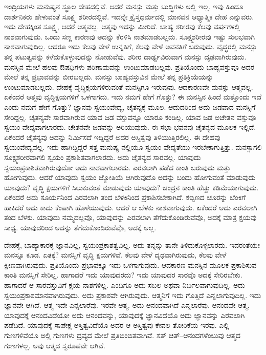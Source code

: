 \vskip 0.2cm

ಇಂದ್ರಿಯಗಳು ಮನುಷ್ಯನ ಸ್ಥೂಲ ದೇಹದಲ್ಲಿವೆ. ಆದರೆ ಮನಸ್ಸು ಮತ್ತು ಬುದ್ಧಿಗಳು ಅಲ್ಲಿ ಇಲ್ಲ. ಇವು ಹಿಂದೂ ದಾರ್ಶನಿಕರು ಹೇಳುವಂತೆ ಸೂಕ್ಷ್ಮ ಶರೀರದಲ್ಲಿವೆ. ಇದನ್ನೇ ಕ್ರೈಸ್ತಧರ್ಮದಲ್ಲಿ ಮಾನವನ ಆಧ್ಯಾತ್ಮಿಕ ದೇಹ ಎನ್ನುವರು. ಇದು ದೇಹಕ್ಕಿಂತ ಸೂಕ್ಷ್ಮ, ಆದರೆ ಆತ್ಮವಲ್ಲ. ಆತ್ಮವು ಇದನ್ನು ಮೀರಿದೆ. ಬಾಹ್ಯ ಶರೀರವು ಕೆಲವು ವರ್ಷಗಳಲ್ಲಿ ನಾಶವಾಗುವುದು. ಒಂದು ಸಣ್ಣ ಕಾರಣವು ಅದನ್ನು ಕೆರಳಿಸಿ ನಾಶಮಾಡಬಲ್ಲದು. ಸೂಕ್ಷ್ಮಶರೀರವು ಇಷ್ಟು ಸುಲಭವಾಗಿ ನಾಶವಾಗುವುದಿಲ್ಲ. ಆದರೂ ಇದು ಕೆಲವು ವೇಳೆ ಉನ್ನತಿಗೆ, ಕೆಲವು ವೇಳೆ ಅವನತಿಗೆ ಬರುವುದು. ವೃದ್ಧರಲ್ಲಿ ಮನಸ್ಸು ತನ್ನ ಪಟುತ್ವವನ್ನು ಕಳೆದುಕೊಳ್ಳುವುದನ್ನು ನೋಡುವೆವು. ಶರೀರ ದಾರ್ಢ್ಯವಿರುವಾಗ ಮನಸ್ಸು ದೃಢವಾಗಿರುವುದು. ಮನಸ್ಸಿನ ಮೇಲೆ ಹಲವು ಔಷಧಿಗಳು ಪರಿಣಾಮವನ್ನು ಉಂಟುಮಾಡಬಲ್ಲವು. ಪ್ರತಿಯೊಂದು ಬಾಹ್ಯವಸ್ತುವೂ ಅದರ ಮೇಲೆ ತನ್ನ ಪ್ರಭಾವವನ್ನು ಬೀರಬಲ್ಲದು. ಮನಸ್ಸು ಬಾಹ್ಯವಸ್ತುವಿನ ಮೇಲೆ ತನ್ನ ಪ್ರತಿಕ್ರಿಯೆಯನ್ನು ಉಂಟುಮಾಡಬಲ್ಲದು. ದೇಹಕ್ಕೆ ವೃದ್ಧಿಕ್ಷಯಗಳಿರುವಂತೆ ಮನಸ್ಸಿಗೂ ಇರುವುವು. ಆದಕಾರಣವೇ ಮನಸ್ಸು ಆತ್ಮವಲ್ಲ. ಏಕೆಂದರೆ ಆತ್ಮವು ವೃದ್ಧಿಕ್ಷಯಗಳಿಗೆ ಒಳಗಾಗದು. ಇದು ನಮಗೆ ಹೇಗೆ ಗೊತ್ತು? ಈ ಮನಸ್ಸಿನ ಹಿಂದೆ ಮತ್ತೊಂದು ಇದೆ ಎಂದು ನಮಗೆ ಹೇಗೆ ಗೊತ್ತು? ಜ್ಞಾನವು ಸ್ವಯಂವೇದ್ಯ, ಚೈತನ್ಯಕ್ಕೆ ಮೂಲ. ಆದುದರಿಂದ ಅದು ಜಡವಾದ ಮನಸ್ಸಿಗೆ ಸೇರಿದ್ದಲ್ಲ. ಚೈತನ್ಯವೇ ಸಾರವಾಗಿರುವ ಯಾವ ಜಡ ವಸ್ತುವನ್ನೂ ಯಾರೂ ಕಂಡಿಲ್ಲ. ಯಾವ ಜಡ ಅಚೇತನ ವಸ್ತುವೂ ಸ್ವಯಂ ವೇದ್ಯವಾಗಲಾರದು. ಚೇತನವೇ ಜಡವನ್ನು ಅರಿಯುವುದು. ಈ ಸಭಾ ಭವನವು ಚೈತನ್ಯದ ಮೂಲಕ ಇಲ್ಲಿದೆ. ಏಕೆಂದರೆ ಚೈತನ್ಯವು ಅದನ್ನು ನಿರ್ಮಿಸದೆ ಇದ್ದಿದ್ದರೆ ಅದರ ಅಸ್ತಿತ್ವವು ತಿಳಿಯುತ್ತಿರಲಿಲ್ಲ. ಈ ದೇಹವು ಸ್ವಯಂವೇದ್ಯವಲ್ಲ. ಇದು ಹಾಗಿದ್ದಿದ್ದರೆ ಸತ್ತ ಮನುಷ್ಯ ನಲ್ಲಿಯೂ ಸ್ವಯಂ ವೇದ್ಯತೆಯು ಇರಬೇಕಾಗುತ್ತಿತ್ತು. ಮನಸ್ಸಾಗಲಿ ಸೂಕ್ಷ್ಮಶರೀರವಾಗಲಿ ಸ್ವಯಂ ಪ್ರಕಾಶಿತವಾಗಲಾರದು. ಅದು ಚೈತನ್ಯದ ಸಾರವಲ್ಲ. ಯಾವುದು ಸ್ವಯಂಪ್ರಕಾಶಿತವಾಗಿರುವುದೋ ಅದು ನಾಶವಾಗಲಾರದು. ಎರವಲಾಗಿ ಪಡೆದ ಕಾಂತಿ ಬರುವುದು ಮತ್ತು ಹೋಗುವುದು. ಆದರೆ ಯಾವುದು ಸ್ವಯಂ ಜ್ಯೋತಿಯೆ ಆಗಿರುವುದೊ ಅದನ್ನು ಬಂದು ಹೋಗುವಂತೆ ಮಾಡುವುದು ಯಾವುದು? ವೃದ್ಧಿ ಕ್ಷಯಗಳಿಗೆ ಸಿಲುಕುವಂತೆ ಮಾಡುವುದು ಯಾವುದು? ಚಂದ್ರನ ಕಾಂತಿ ಹೆಚ್ಚು ಕಡಿಮೆಯಾಗುವುದು. ಏಕೆಂದರೆ ಅದು ಸೂರ್ಯನಿಂದ ಎರವಲಾಗಿ ತಂದ ಬೆಳಕಿನಿಂದ ಪ್ರಕಾಶಿಸಬೇಕಾಗಿದೆ. ಕಬ್ಬಿಣದ ಚೂರನ್ನು ಬೆಂಕಿಗೆ ಹಾಕಿದರೆ ಅದು ಕಾದು ಕೆಂಪಾಗಿ ಹೊಳೆಯುವುದು. ಆದರೆ ಆ ಬೆಳಕು ನಾಶವಾಗುವುದು. ಏಕೆಂದರೆ ಅದು ಎರವಲಾಗಿ ತಂದ ಬೆಳಕು. ಯಾವುದು ನಮ್ಮದಲ್ಲವೊ, ಯಾವುದನ್ನು ಎರವಲಾಗಿ ತೆಗೆದುಕೊಂಡಿರುವೆವೊ, ಅದಕ್ಕೆ ಮಾತ್ರ ಕ್ಷಯವು ಸಾಧ್ಯ. ಯಾವುದರಿಂದ ಅದನ್ನು ತೆಗೆದುಕೊಂಡಿರುವೆವೊ, ಅದಕ್ಕೆ ಅಲ್ಲ.

\vskip 0.2cm

ದೇಹಕ್ಕೆ, ಬಾಹ್ಯಾಕಾರಕ್ಕೆ ಜ್ಞಾನವಿಲ್ಲ, ಸ್ವಯಂಪ್ರಕಾಶತ್ವವಿಲ್ಲ. ಅದು ತನ್ನನ್ನು ತಾನೇ ತಿಳಿದುಕೊಳ್ಳಲಾರದು. ಇದರಂತೆಯೇ ಮನಸ್ಸೂ ಕೂಡ. ಏತಕ್ಕೆ? ಮನಸ್ಸಿಗೆ ವೃದ್ಧಿ ಕ್ಷಯಗಳಿವೆ. ಕೆಲವು ವೇಳೆ ದೃಢವಾಗಿರುವುದು, ಕೆಲವು ವೇಳೆ ಕ್ಷೀಣವಾಗಿರುವುದು. ಪ್ರತಿಯೊಂದು ಪ್ರಭಾವಕ್ಕೂ ಇದು ಒಳಗಾಗುವುದು. ಆದಕಾರಣ ಮನಸ್ಸಿನ ಮೂಲಕ ಪ್ರಕಾಶಿಸುವ ಕಾಂತಿ ಮನಸ್ಸಿಗೆ ಸೇರಿಲ್ಲ. ಹಾಗಾದರೆ ಇದು ಯಾವುದರದು? ಇದು ಯಾವುದರ ಸಾರವೊ ಅದಕ್ಕೆ ಸೇರಿರಬೇಕು. ಹಾಗಾದರೆ ಆ ಸಾರವಸ್ತುವಿಗೆ ಕ್ಷಯ ನಾಶಗಳಿಲ್ಲ. ಎಂದಿಗೂ ಅದು ಸಬಲ ಅಥವಾ ನಿರ್ಬಲವಾಗುವುದಿಲ್ಲ. ಅದು ಸ್ವಯಂಪ್ರಕಾಶಮಾನವಾಗಿರುವುದು. ಅದು ಪ್ರಕಾಶವೇ ಆಗಿರುವುದು. ಆತ್ಮನಿಗೆ ಇದು ಗೊತ್ತಿದೆ ಎನ್ನಲಾಗುವುದಿಲ್ಲ. ಇದು ಜ್ಞಾನವೇ ಆಗಿದೆ. ಆತ್ಮ ಇದೇ ಎನ್ನಲಾರೆವು. ಇರವೇ ಆತ್ಮ. ಅದು ಆನಂದವಾಗಿದೆ ಎನ್ನಲಾರೆವು. ಆನಂದವೇ ಆತ್ಮ. ಯಾವುದಕ್ಕೆ ಆನಂದವಿದೆಯೋ ಅದು ಆನಂದವನ್ನು, ಯಾವುದಕ್ಕೆ ಜ್ಞಾನವಿದೆಯೊ ಅದು ಜ್ಞಾನವನ್ನು ಎರವಲಾಗಿ ಪಡೆದಿದೆ. ಯಾವುದಕ್ಕೆ ಸಾಪೇಕ್ಷ ಅಸ್ತಿತ್ವವಿದೆಯೊ ಅದರ ಆ ಅಸ್ತಿತ್ವವು ಕೇವಲ ತೋರಿಕೆಯ ಇರವು. ಎಲ್ಲಿ ಗುಣಗಳಿವೆಯೊ ಅಲ್ಲಿ ಗುಣಗಳು ದ್ರವ್ಯದ ಮೇಲೆ ಪ್ರತಿಬಿಂಬಿತವಾಗಿವೆ. ಸತ್​ ಚಿತ್​–ಆನಂದಗಳೆಂಬುವು ಆತ್ಮದ ಗುಣಗಳಲ್ಲ. ಅವು ಆತ್ಮದ ಸ್ವರೂಪವೇ ಆಗಿವೆ.

